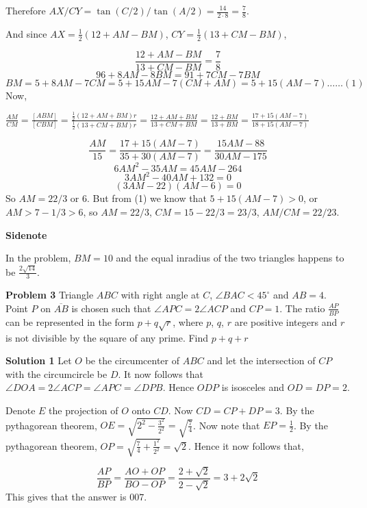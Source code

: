 \documentclass[a4paper,11pt]{article}
\begin{document}
Therefore $AX/CY = \tan(C/2)/\tan(A/2) = \frac{14}{2\cdot 8}= \frac{7}{8}.$

And since $AX=\frac{1}{2}(12+AM-BM)$, $CY = \frac{1}{2}(13+CM-BM)$,

\[\frac{12+AM-BM}{13+CM-BM} = \frac{7}{8}\]
\[96+8AM-8BM = 91 +7CM-7BM\]
\[BM= 5 + 8AM-7CM = 5 + 15AM - 7(CM+AM) = 5+15(AM-7) \dots\dots (1)\]
Now,

$\frac{AM}{CM} = \frac{[ABM]}{[CBM]} = \frac{\frac{1}{2}(12+AM+BM)r}{\frac{1}{2}(13+CM+BM)r}=\frac{12+AM+BM}{13+CM+BM}= \frac{12+BM}{13+BM} = \frac{17+15(AM-7)}{18+15(AM-7)}$

\[\frac{AM}{15} = \frac{17+15(AM-7)}{35+30(AM-7)} = \frac{15AM-88}{30AM-175}\]\[6AM^2 - 35AM = 45AM-264\]\[3AM^2 -40AM+132=0\]\[(3AM-22)(AM-6)=0\]
So $AM=22/3$ or $6$. But from (1) we know that $5+15(AM-7)>0$, or $AM>7-1/3>6$, so $AM=22/3$, $CM=15-22/3=23/3$, $AM/CM=22/23$.

\textbf{Sidenote}

In the problem, $BM=10$ and the equal inradius of the two triangles happens to be $\frac {2\sqrt{14}}{3}$.

\textbf{Problem 3}
Triangle $ABC$ with right angle at $C$, $\angle BAC < 45^\circ$ and $AB = 4$. Point $P$ on $\overline{AB}$ is chosen such that $\angle APC = 2\angle ACP$ and $CP = 1$. The ratio $\frac{AP}{BP}$ can be represented in the form $p + q\sqrt{r}$, where $p$, $q$, $r$ are positive integers and $r$ is not divisible by the square of any prime. Find $p+q+r$

\textbf{Solution 1}
Let $O$ be the circumcenter of $ABC$ and let the intersection of $CP$ with the circumcircle be $D$. It now follows that $\angle{DOA} = 2\angle ACP = \angle{APC} = \angle{DPB}$. Hence $ODP$ is isosceles and $OD = DP = 2$.

Denote $E$ the projection of $O$ onto $CD$. Now $CD = CP + DP = 3$. By the pythagorean theorem, $OE = \sqrt {2^2 - \frac {3^2}{2^2}} = \sqrt {\frac {7}{4}}$. Now note that $EP = \frac {1}{2}$. By the pythagorean theorem, $OP = \sqrt {\frac {7}{4} + \frac {1^2}{2^2}} = \sqrt {2}$. Hence it now follows that,

\[\frac {AP}{BP} = \frac {AO + OP}{BO - OP} = \frac {2 + \sqrt {2}}{2 - \sqrt {2}} = 3 + 2\sqrt {2}\]
This gives that the answer is $\boxed{007}$.
\end{document}
